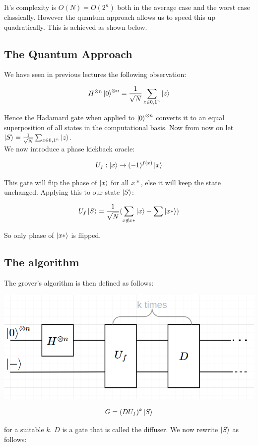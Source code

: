 \documentclass{article}
\begin{document}
It's complexity is $O(N) = O(2^n)$ both in the average case and the worst case classically.
However the quantum approach allows us to speed this up quadratically.
This is achieved as shown below.


\subsection{The Quantum Approach}
We have seen in previous lectures the following observation:

$$H^{\otimes n}\ket{0}^{\otimes n} = \frac{1}{\sqrt{N}}\sum_{z \in {0,1}^n}\ket{z}$$

Hence the Hadamard gate when applied to $\ket{0}^{\otimes n}$ converts it to an equal superposition of all states in the computational basis. Now from now on let
$\ket{S} =\frac{1}{\sqrt{N}}\sum_{z \in {0,1}^n}\ket{z} $. \\

We now introduce a phase kickback oracle:

$$U_f: \ket{x} \rightarrow (-1)^{f(x)}\ket{x}$$

This gate will flip the phase of $\ket{x}$ for all $x*$, else it will keep the state unchanged. Applying this to our state $\ket{S}$:

$$U_f\ket{S} = \frac{1}{\sqrt{N}}(\sum_{x \notin x*}\ket{x} - \sum\ket{x*})$$

So only phase of $\ket{x*}$ is flipped. \\

\subsection{The algorithm}
The grover's algorithm is then defined as follows: \\

{
\centering
\includegraphics[width=12 cm]{algorithm.png}\par
}

$$G = (DU_f)^k\ket{S}$$

for a suitable $k$. $D$ is a gate that is called the diffuser. We now rewrite $\ket{S}$ as follows:
\end{document}
